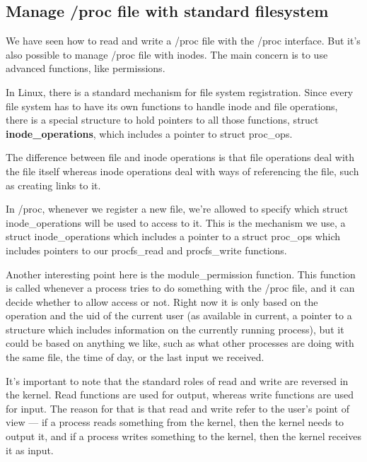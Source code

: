 \documentclass[11pt]{article}
\begin{document}
\subsection{Manage /proc file with standard filesystem}
\label{sec:org3d7029a}
We have seen how to read and write a /proc file with the /proc interface. But it's also possible to manage /proc file with inodes. The main concern is to use advanced functions, like permissions.

In Linux, there is a standard mechanism for file system registration. Since every file system has to have its own functions to handle inode and file operations, there is a special structure to hold pointers to all those functions, struct \textbf{inode\_operations}, which includes a pointer to struct proc\_ops.

The difference between file and inode operations is that file operations deal with the file itself whereas inode operations deal with ways of referencing the file, such as creating links to it.

In /proc, whenever we register a new file, we're allowed to specify which struct inode\_operations will be used to access to it. This is the mechanism we use, a struct inode\_operations which includes a pointer to a struct proc\_ops which includes pointers to our procfs\_read and procfs\_write functions.

Another interesting point here is the module\_permission function. This function is called whenever a process tries to do something with the /proc file, and it can decide whether to allow access or not. Right now it is only based on the operation and the uid of the current user (as available in current, a pointer to a structure which includes information on the currently running process), but it could be based on anything we like, such as what other processes are doing with the same file, the time of day, or the last input we received.

It's important to note that the standard roles of read and write are reversed in the kernel. Read functions are used for output, whereas write functions are used for input. The reason for that is that read and write refer to the user's point of view --- if a process reads something from the kernel, then the kernel needs to output it, and if a process writes something to the kernel, then the kernel receives it as input.
\end{document}
